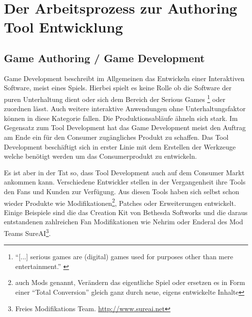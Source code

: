 \documentclass[pagesize, paper=a4, fontsize=12pt, titlepage=true, headings=small, headnosepline, abstractoff, liststotoc, nochapterprefix, plainheadsepline, twoside]{scrreprt}
\begin{document}
\section{Der Arbeitsprozess zur Authoring Tool Entwicklung}
\subsection{Game Authoring / Game Development}
Game Development beschreibt im Allgemeinen das Entwickeln einer Interaktiven Software, meist eines Spiels. Hierbei spielt es keine Rolle ob die Software der puren Unterhaltung dient oder sich dem Bereich der Serious Games \footnote{ “[...] serious games are (digital) games used for purposes other than mere entertainment.” \cite{Tarja2007}} oder zuordnen lässt. Auch weitere interaktive Anwendungen ohne Unterhaltungsfaktor können in diese Kategorie fallen. Die Produktionsabläufe ähneln sich stark. Im Gegensatz zum Tool Development hat das Game Development meist den Auftrag am Ende ein für den Consumer zugängliches Produkt zu schaffen. Das Tool Development beschäftigt sich in erster Linie mit dem Erstellen der Werkzeuge welche benötigt werden um das Consumerprodukt zu entwickeln.

Es ist aber in der Tat so, dass Tool Development auch auf dem Consumer Markt ankommen kann. Verschiedene Entwickler stellen in der Vergangenheit ihre Tools den Fans und Kunden zur Verfügung. Aus diesen Tools haben sich selbst schon wieder Produkte wie Modifikationen\footnote{auch Mods genannt, Verändern das eigentliche Spiel oder ersetzen es in Form einer “Total Conversion” gleich ganz durch neue, eigens entwickelte Inhalte}, Patches oder Erweiterungen entwickelt. Einige Beispiele sind die das Creation Kit von Bethesda Softworks und die daraus entstandenen zahlreichen Fan Modifikationen wie Nehrim oder Enderal des Mod Teams SureAI\footnote{Freies Modifikations Team. \url{http://www.sureai.net}}.

\end{document}
